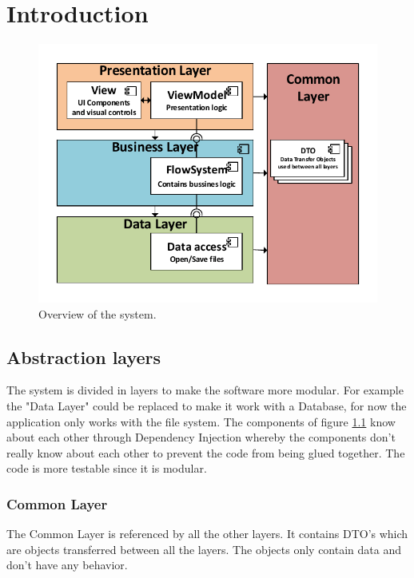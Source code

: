 \chapter{Introduction}
\begin{figure}[h!]
  \centering
    \includegraphics{figures/SystemOverview.pdf}
  \caption{Overview of the system.}
  \label{fig:systemoverview}
\end{figure}

\section{Abstraction layers}
The system is divided in layers to make the software more modular. For example the "Data Layer" could be replaced to make it work with a Database, for now the application only works with the file system. The components of figure \ref{fig:systemoverview} know about each other through Dependency Injection whereby the components don't really know about each other to prevent the code from being glued together. The code is more testable since it is modular.

\subsection{Common Layer}
The Common Layer is referenced by all the other layers. It contains DTO's which are objects transferred between all the layers. The objects only contain data and don't have any behavior.

